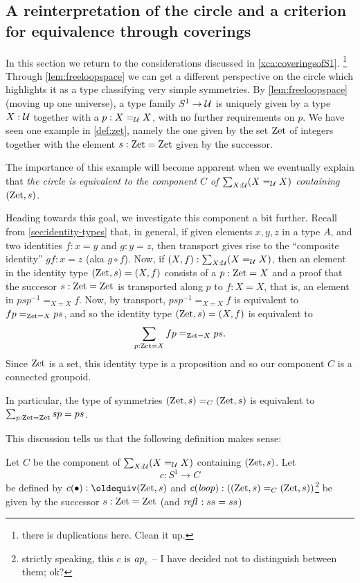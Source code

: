 \subsection{A reinterpretation of the circle and a criterion for equivalence through coverings}
\label{sec:S1isC}
In this section we return to the considerations discussed in \cref{xca:coveringsofS1}.
 \footnote{there is duplications here.  Clean it up.}
  Through \cref{lem:freeloopspace} we can get a different perspective on the circle which highlights it as a type classifying very simple symmetries.
By \cref{lem:freeloopspace} (moving up one universe), a type family $S^1\to\mathcal{U}$ is uniquely given by a type $X:\mathcal{U}$ together with a $p:X=_{\mathcal{U}} X$, with no further requirements on $p$.  We have seen one example in \cref{def:zet}, namely the one given by the set $\mathrm{Zet}$ of integers together with the element $s:\mathrm{Zet}=\mathrm{Zet}$ given by the successor.  

The importance of this example will become apparent when we eventually explain that \emph{the circle is equivalent to the component $C$ of $\sum_{X:\mathcal{U}}(X=_{\mathcal{U}}X)$ containing $(\mathrm{Zet},s)$}. 

Heading towards this goal, we investigate this component a bit further.  Recall from \cref{sec:identity-types} that, in general, if given elements $x,y,z$ in a type $A$, and two identities $f:x=y$ and $g:y=z$, then transport gives rise to the ``composite identity'' $gf:x=z$ (aka $g\circ f$).    Now, if $(X,f):\sum_{X:\mathcal{U}}(X=_{\mathcal{U}}X)$, then an element in the identity type $(\mathrm{Zet},s)=(X,f)$ consists of a $p:\mathrm{Zet}=X$ and a proof that the succesor $s:\mathrm{Zet}=\mathrm{Zet}$  is transported along $p$ to $f:X=X$, that is, an element in $psp^{-1}=_{X=X}f$.  Now, by transport, $psp^{-1}=_{X=X}f$ is equivalent to $fp=_{\mathrm{Zet}=X}ps$, and so the identity type $(\mathrm{Zet},s)=(X,f)$ is equivalent to
$$\sum_{p:\mathrm{Zet}=X}fp=_{\mathrm{Zet}=X}ps.$$ %
Since $\mathrm{Zet}$ is a set, this identity type is a proposition and so our component $C$ is a connected groupoid.  

In particular, the type of symmetries $(\mathrm{Zet},s)=_C(\mathrm{Zet},s)$ is equivalent to $\sum_{p:\mathrm{Zet}=\mathrm{Zet}}sp=ps$.  

This discussion tells us that the following definition makes sense:

\begin{definition}\label{def:S1toC}
  Let $C$ be the component of $\sum_{X:\mathcal{U}}(X=_{\mathcal{U}}X)$ containing $(\mathrm{Zet},s)$.
  Let $$c:S^1\to C$$ be defined by $c(\base)\defequi (\zet,s)$ and $c(\mathit{loop}):((\mathrm{Zet},s)=_C(\mathrm{Zet},s))$\footnote{strictly speaking, this $c$ is $\mathop{{\it ap}_{c}}$ -- I have decided not to distinguish between them; ok?} be given by the successor $s:\mathrm{Zet}=\mathrm{Zet}$ (and $\mathop{{\it refl}_{}}:ss=ss$)
\end{definition}


